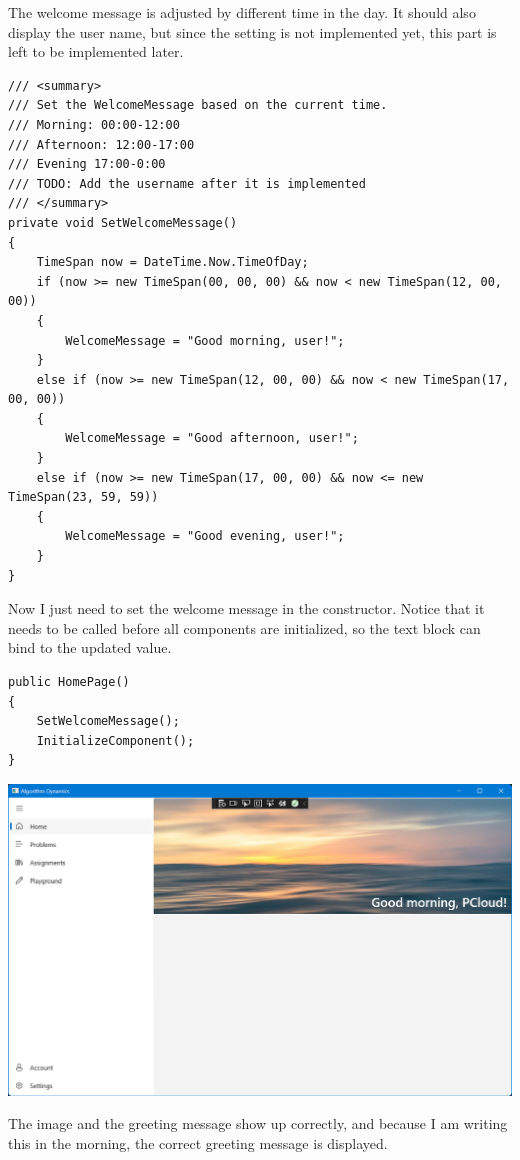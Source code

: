 \documentclass[a4paper]{report}
\begin{document}
The welcome message is adjusted by different time in the day. It should also display the user name, but since the setting is not implemented yet, this part is left to be implemented later.

\begin{verbatim}
/// <summary>
/// Set the WelcomeMessage based on the current time.
/// Morning: 00:00-12:00
/// Afternoon: 12:00-17:00
/// Evening 17:00-0:00
/// TODO: Add the username after it is implemented
/// </summary>
private void SetWelcomeMessage()
{
    TimeSpan now = DateTime.Now.TimeOfDay;
    if (now >= new TimeSpan(00, 00, 00) && now < new TimeSpan(12, 00, 00))
    {
        WelcomeMessage = "Good morning, user!";
    }
    else if (now >= new TimeSpan(12, 00, 00) && now < new TimeSpan(17, 00, 00))
    {
        WelcomeMessage = "Good afternoon, user!";
    }
    else if (now >= new TimeSpan(17, 00, 00) && now <= new TimeSpan(23, 59, 59))
    {
        WelcomeMessage = "Good evening, user!";
    }
}
\end{verbatim}

Now I just need to set the welcome message in the constructor. Notice that it needs to be called before all components are initialized, so the text block can bind to the updated value.

\begin{verbatim}
public HomePage()
{
    SetWelcomeMessage();
    InitializeComponent();
}
\end{verbatim}

\includegraphics[width=\textwidth, height=\textheight, keepaspectratio]{HomePage-Image}

The image and the greeting message show up correctly, and because I am writing this in the morning, the correct greeting message is displayed.
\end{document}

